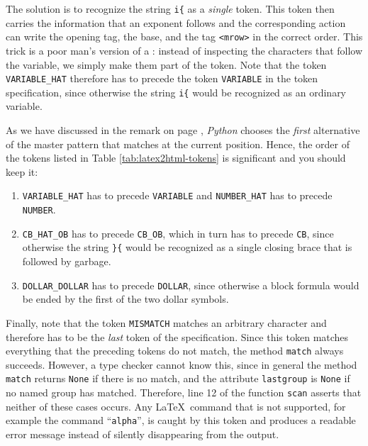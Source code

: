 The solution is to recognize the string \texttt{i\{} as a \emph{single} token.  This token then
carries the information that an exponent follows and the corresponding action can write the opening tag, the
base, and the tag \texttt{<mrow>} in the correct order.  This trick is a poor man's version of a
: instead of inspecting the characters that follow the variable, we simply make
them part of the token.  Note that the token \texttt{VARIABLE\_HAT} therefore has to precede the token
\texttt{VARIABLE} in the token specification, since otherwise the string \texttt{i\{} would be
recognized as an ordinary variable.
\eox

\remarkEng
As we have discussed in the remark on page \pageref{fig:regexp-scanner.py-1}, \textsl{Python} chooses the
\emph{first} alternative of the master pattern that matches at the current position.  Hence, the order of the
tokens listed in Table \ref{tab:latex2html-tokens} is significant and you should keep it:
\begin{enumerate}
\item \texttt{VARIABLE\_HAT} has to precede \texttt{VARIABLE} and \texttt{NUMBER\_HAT} has to precede
      \texttt{NUMBER}.
\item \texttt{CB\_HAT\_OB} has to precede \texttt{CB\_OB}, which in turn has to precede \texttt{CB}, since
      otherwise the string \texttt{\}\{} would be recognized as a single closing brace that is
      followed by garbage.
\item \texttt{DOLLAR\_DOLLAR} has to precede \texttt{DOLLAR}, since otherwise a block formula would be ended
      by the first of the two dollar symbols.
\end{enumerate}
Finally, note that the token \texttt{MISMATCH} matches an arbitrary character and therefore has to be the
\emph{last} token of the specification.  Since this token matches everything that the preceding tokens do not
match, the method \texttt{match} always succeeds.  However, a type checker cannot know this, since in
general the method \texttt{match} returns \texttt{None} if there is no match, and the attribute
\texttt{lastgroup} is \texttt{None} if no named group has matched.  Therefore, line 12 of the function
\texttt{scan} asserts that neither of these cases occurs.  Any \LaTeX\ command that is not supported, for example the command
``\texttt{alpha}'', is caught by this token and produces a readable error message instead of silently
disappearing from the output.
\eox


